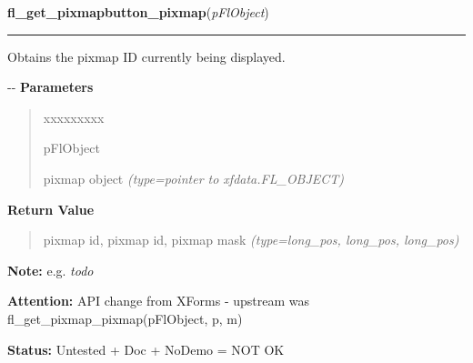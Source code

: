 \hspace{.8\funcindent}\begin{boxedminipage}{\funcwidth}

    \raggedright \textbf{fl\_get\_pixmapbutton\_pixmap}(\textit{pFlObject})

    \vspace{-1.5ex}

    \rule{\textwidth}{0.5\fboxrule}
\setlength{\parskip}{2ex}

Obtains the pixmap ID currently being displayed.

-{}-
\setlength{\parskip}{1ex}
      \textbf{Parameters}
      \vspace{-1ex}

      \begin{quote}
        \begin{Ventry}{xxxxxxxxx}

          \item[pFlObject]


pixmap object
            {\it (type=pointer to xfdata.FL\_OBJECT)}

        \end{Ventry}

      \end{quote}

      \textbf{Return Value}
    \vspace{-1ex}

      \begin{quote}

pixmap id, pixmap id, pixmap mask
      {\it (type=long\_pos, long\_pos, long\_pos)}

      \end{quote}

\textbf{Note:} 
e.g. \emph{todo}


\textbf{Attention:} 
API change from XForms - upstream was
fl\_get\_pixmap\_pixmap(pFlObject, p, m)


\textbf{Status:} 
Untested + Doc + NoDemo = NOT OK


    \end{boxedminipage}

    \label{xformslib:flbitmap:fl_read_pixmapfile}

    \vspace{0.5ex}

